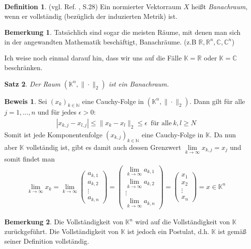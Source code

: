 \documentclass[10pt,a4paper]{article}
\theoremstyle{plain}
\newtheorem{satz}{Satz}[section]
\newenvironment{sa}{\begin{shaded}\begin{satz}}{\end{satz}\end{shaded}}
\theoremstyle{definition}
\newtheorem{definition}[satz]{Definition}
\newenvironment{dfi}{\begin{shaded}\begin{definition}}{\end{definition}\end{shaded}}
\theoremstyle{nonumberplain}
\newtheorem{bemerkung}{Bemerkung}
\newenvironment{bem}{\begin{bemerkung}}{\end{bemerkung}}
\newtheorem{beweis}{Beweis}
\newenvironment{bew}{\begin{beweis}}{\end{beweis}}
\newcommand{\N}{\mathbb{N}}
\newcommand{\R}{\mathbb{R}}
\newcommand{\C}{\mathbb{C}}
\newcommand{\K}{\mathbb{K}}
\begin{document}
\begin{dfi}
(vgl. Ref. \cite{Alt}, S.28) Ein normierter Vektorraum $X$ heißt \textit{Banachraum}, wenn er vollständig (bezüglich der induzierten Metrik) ist.
\end{dfi}
\begin{bem}
Tatsächlich sind sogar die meisten Räume, mit denen man sich in der angewandten Mathematik beschäftigt, Banachräume. (z.B $\R, \R^n, \C, \C^n$)
\end{bem}
Ich weise noch einmal darauf hin, dass wir uns auf die Fälle $\K = \R$ oder $\K = \C$ beschränken.
\begin{sa}
Der Raum $(\K^n, \|\cdot\|_2)$ ist ein Banachraum.
\end{sa}
\begin{bew}
Sei ${(x_k)_{k \in \N}}$ eine Cauchy-Folge in $(\K^n, \|\cdot\|_2)$. Dann gilt für alle $j = 1, ..., n$ und für jedes $\epsilon > 0$:
\begin{align*}
|x_{k,j} - x_{l,j}| \leq \|x_k - x_l\|_2 \leq \epsilon \enspace \text{für alle} \: k,l \geq N
\end{align*}
Somit ist jede Komponentenfolge ${(x_{k,j})_{k \in \N}}$ eine Cauchy-Folge in $\K$. Da nun aber $\K$ vollständig ist, gibt es damit auch dessen Grenzwert $\lim\limits_{k \to \infty}{x_{k,j}} = x_j$ und somit findet man
\begin{align*}
\lim_{k \to \infty}{x_k} = \lim_{k \to \infty} \left(\begin{array}{c} a_{k,1} \\ a_{k,2} \\ \vdots \\ a_{k,n} \end{array}\right) = \left(\begin{array}{c} \lim\limits_{k \to \infty}{a_{k,1}} \\ \lim\limits_{k \to \infty}{a_{k,2}} \\ \vdots \\ \lim\limits_{k \to \infty}{a_{k,n}} \end{array}\right) = \left(\begin{array}{c} x_1 \\ x_2 \\ \vdots \\ x_n \end{array}\right) = x \in \K^n
\end{align*}
\end{bew}
\begin{bem}
Die Vollständigkeit von $\K^n$ wird auf die Vollständigkeit von $\K$ zurückgeführt. Die Vollständigkeit von $\K$ ist jedoch ein Postulat, d.h. $\K$ ist gemäß seiner Definition vollständig.
\end{bem}
\end{document}
